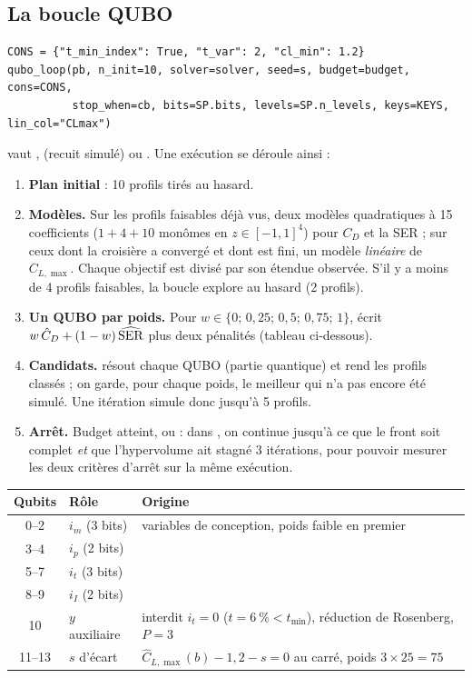 \subsection{La boucle QUBO}
\begin{lstlisting}
CONS = {"t_min_index": True, "t_var": 2, "cl_min": 1.2}
qubo_loop(pb, n_init=10, solver=solver, seed=s, budget=budget, cons=CONS,
          stop_when=cb, bits=SP.bits, levels=SP.n_levels, keys=KEYS, lin_col="CLmax")
\end{lstlisting}
 vaut ,  (recuit simulé) ou . Une exécution se déroule ainsi :
\begin{enumerate}
\item \textbf{Plan initial} : 10 profils tirés au hasard.
\item \textbf{Modèles.} Sur les profils faisables déjà vus, deux modèles quadratiques à 15 coefficients ($1+4+10$ monômes en $z\in[-1,1]^4$) pour $C_D$ et la SER ; sur ceux dont la croisière a convergé et dont  est fini, un modèle \emph{linéaire} de $C_{L,\max}$. Chaque objectif est divisé par son étendue observée. S'il y a moins de 4 profils faisables, la boucle explore au hasard (2 profils).
\item \textbf{Un QUBO par poids.} Pour $w\in\{0;\,0{,}25;\,0{,}5;\,0{,}75;\,1\}$,  écrit $w\,\hat C_D+(1-w)\,\widehat{\rm SER}$ plus deux pénalités (tableau ci-dessous).
\item \textbf{Candidats.}  résout chaque QUBO (partie quantique) et rend les profils classés ; on garde, pour chaque poids, le meilleur qui n'a pas encore été simulé. Une itération simule donc jusqu'à 5 profils.
\item \textbf{Arrêt.} Budget atteint, ou  : dans , on continue jusqu'à ce que le front soit complet \emph{et} que l'hypervolume ait stagné 3 itérations, pour pouvoir mesurer les deux critères d'arrêt sur la même exécution.
\end{enumerate}

\begin{center}
\renewcommand{\arraystretch}{1.2}
\begin{tabular}{clp{8.2cm}}
\toprule
Qubits & Rôle & Origine \\
\midrule
0--2 & $i_m$ (3 bits) & variables de conception, poids faible en premier \\
3--4 & $i_p$ (2 bits) & \\
5--7 & $i_t$ (3 bits) & \\
8--9 & $i_I$ (2 bits) & \\
10 & $y$ auxiliaire & interdit $i_t=0$ ($t=6~\%<t_{\min}$), réduction de Rosenberg, $P=3$ \\
11--13 & $s$ d'écart & $\hat C_{L,\max}(b)-1{,}2-s=0$ au carré, poids $3\times25=75$ \\
\bottomrule
\end{tabular}
\end{center}

